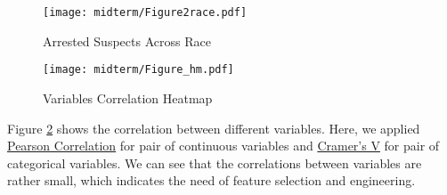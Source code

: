 \documentclass[letterpaper, twocolumn]{article}
\begin{document}
\begin{figure}[htbp]
    \centering
    \texttt{[image: midterm/Figure2race.pdf]}
    \caption{Arrested Suspects Across Race}
    \label{fig:race}
\end{figure}

\begin{figure}[htbp]
    \centering
    \texttt{[image: midterm/Figure\_hm.pdf]}
    \caption{Variables Correlation Heatmap}
    \label{fig:hm}
\end{figure}

Figure \ref{fig:hm} shows the correlation between different variables. Here, we applied \href{https://en.wikipedia.org/wiki/Pearson_correlation_coefficient}{Pearson Correlation} for pair of continuous variables and \href{https://en.wikipedia.org/wiki/Cram\%C3\%A9r\%27s_V}{Cramer's V} for pair of categorical variables. We can see that the correlations between variables are rather small, which indicates the need of feature selection  and engineering.

\end{document}

